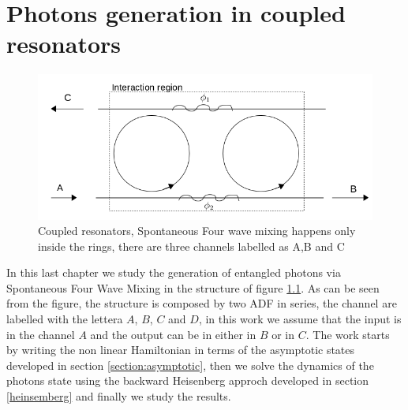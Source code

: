 \chapter{Photons generation in coupled resonators}
\begin{figure}[H]
\centering
\includegraphics[width = .8\textwidth]{img/system}
\caption{Coupled resonators, Spontaneous Four wave mixing happens only inside the rings, there are three channels labelled as A,B and C}
\label{couplesstructure}
\end{figure}

In this last chapter we study the generation of entangled photons via Spontaneous Four Wave Mixing in the structure of figure \ref{couplesstructure}. As can be seen from the figure, the structure is composed by two ADF in series, the channel are labelled with the lettera $A$, $B$, $C$ and $D$, in this work we assume that the input is in the channel $A$ and the output can be in either in $B$ or in $C$. The work starts by writing the non linear Hamiltonian in terms of the asymptotic states developed in section \ref{section:asymptotic}, then we solve the dynamics of the photons state using the backward Heisenberg approch developed in section \ref{heinsemberg} and finally we study the results.
